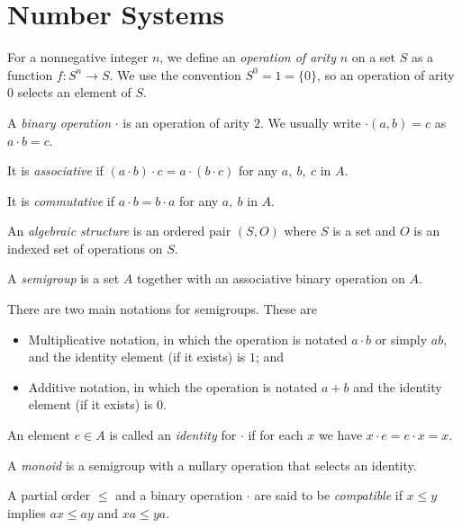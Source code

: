 \section{Number Systems}
\begin{defn}
    For a nonnegative integer $n$, we define an \emph{operation of arity} $n$ on
    a set $S$ as a function $f:S^n\to S$. We use the convention $S^0=1=\{0\}$,
    so an operation of arity $0$ selects an element of $S$.
\end{defn}
\begin{defn}
    A \emph{binary operation} $\cdot$ is an operation of arity $2$. We
    usually write $\cdot(a,b)=c$ as $a\cdot b=c$.

    It is \emph{associative} if $(a\cdot b)\cdot c=a\cdot(b\cdot
    c)$ for any $a,\ b,\ c$ in $A$.

    It is \emph{commutative} if $a\cdot b=b\cdot a$ for any $a,\ b$ in $A$.
\end{defn}
\begin{defn}
      An \emph{algebraic structure} is an ordered pair $(S,O)$ where $S$ is a
      set and $O$ is an indexed set of operations on $S$.
\end{defn}
\begin{defn}
    A \emph{semigroup} is a set $A$ together with an associative binary
    operation on $A$.
\end{defn}
\begin{rem}
    There are two main notations for semigroups. These are
    \begin{itemize}
        \item Multiplicative notation, in which the operation is notated $a\cdot b$ or
        simply $ab$, and the identity element (if it exists) is $1$; and
        \item Additive notation, in which the operation is notated $a+b$ and the
        identity element (if it exists) is $0$.
    \end{itemize}
\end{rem}
\begin{defn}
    An element $e\in A$ is called an \emph{identity} for $\cdot$ if for each $x$
    we have $x\cdot e=e\cdot x=x$.
\end{defn}
\begin{defn}
      A \emph{monoid} is a semigroup with a nullary operation that selects
      an identity.
\end{defn}
\begin{defn}
    A partial order $\le$ and a binary operation $\cdot$ are said to be
    \emph{compatible} if $x\le y$ implies $ax\le ay$ and $xa\le ya$.
\end{defn}
